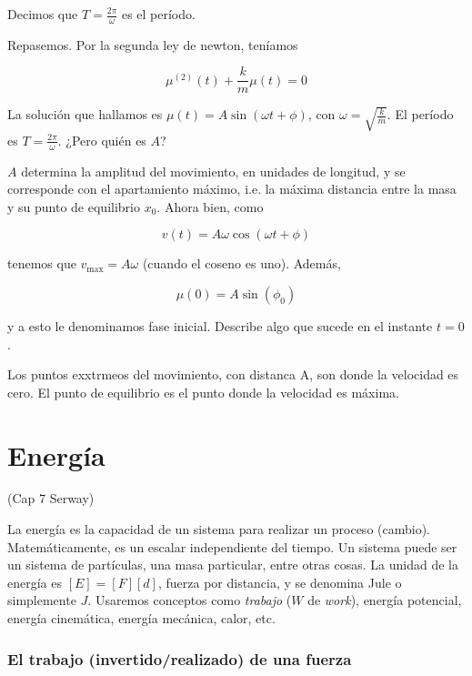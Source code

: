 \documentclass[12pt]{article}
\theoremstyle{definition}
\begin{document}
Decimos que $T= \frac{2\pi}{\omega}$ es el período. 

Repasemos. Por la segunda ley de newton, teníamos 

\begin{equation*}
    \mu^{(2)}(t) + \frac{k}{m} \mu(t) = 0
\end{equation*}

La solución que hallamos es $\mu(t) = A \sin(\omega t + \phi)$, con $\omega =
\sqrt{\frac{k}{m}} $. El período es $T = \frac{2\pi}{\omega}$. ¿Pero quién es
$A$?  

$A$ determina la amplitud del movimiento, en unidades de longitud, y se
corresponde con el apartamiento máximo, i.e. la máxima distancia entre la masa y
su punto de equilibrio $x_0$.  Ahora bien, como 

\begin{equation*}
    v(t) = A \omega \cos(\omega t + \phi)
\end{equation*}

tenemos que $v_{\max} = A \omega$ (cuando el coseno es uno). Además, 

\begin{equation*}
    \mu(0) = A \sin(\phi_0)
\end{equation*}

y a esto le denominamos fase inicial. Describe algo que sucede en el instante $t
= 0$.

Los puntos exxtrmeos del movimiento, con distanca A, son donde la velocidad es
cero. El punto de equilibrio es el punto donde la velocidad es máxima.   

\section{Energía}

(Cap 7 Serway)

La energía es la capacidad de un sistema para realizar un proceso (cambio).
Matemáticamente, es un escalar independiente del tiempo. Un sistema puede ser un
sistema de partículas, una masa particular, entre otras cosas. La unidad de la
energía es $\left[ E \right] = \left[ F \right]\left[ d \right]    $, fuerza por
distancia, y se denomina Jule o simplemente $J$. Usaremos conceptos como
\textit{trabajo} ($W$ de \textit{work}), energía potencial, energía cinemática,
energía mecánica, calor, etc.

\subsubsection{El trabajo (invertido/realizado) de una fuerza}
\end{document}
